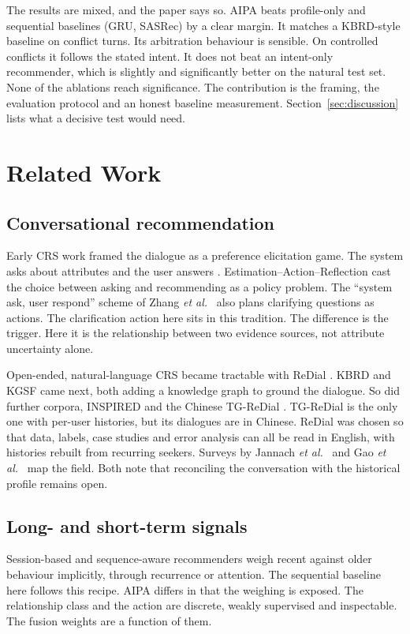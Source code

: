 The results are mixed, and the paper says so. AIPA beats profile-only and sequential baselines (GRU, SASRec) by a clear margin. It matches a KBRD-style baseline on conflict turns. Its arbitration behaviour is sensible. On controlled conflicts it follows the stated intent. It does not beat an intent-only recommender, which is slightly and significantly better on the natural test set. None of the ablations reach significance. The contribution is the framing, the evaluation protocol and an honest baseline measurement. Section~\ref{sec:discussion} lists what a decisive test would need.

\section{Related Work}
\subsection{Conversational recommendation}
Early CRS work framed the dialogue as a preference elicitation game. The system asks about attributes and the user answers \cite{christakopoulou2016towards,sun2018crm}. Estimation--Action--Reflection \cite{lei2020ear} cast the choice between asking and recommending as a policy problem. The ``system ask, user respond'' scheme of Zhang \emph{et al.}\ \cite{zhang2018conversational} also plans clarifying questions as actions. The clarification action here sits in this tradition. The difference is the trigger. Here it is the relationship between two evidence sources, not attribute uncertainty alone.

Open-ended, natural-language CRS became tractable with ReDial \cite{li2018redial}. KBRD \cite{chen2019kbrd} and KGSF \cite{zhou2020kgsf} came next, both adding a knowledge graph to ground the dialogue. So did further corpora, INSPIRED \cite{hayati2020inspired} and the Chinese TG-ReDial \cite{zhou2020tgredial}. TG-ReDial is the only one with per-user histories, but its dialogues are in Chinese. ReDial was chosen so that data, labels, case studies and error analysis can all be read in English, with histories rebuilt from recurring seekers. Surveys by Jannach \emph{et al.}\ \cite{jannach2021survey} and Gao \emph{et al.}\ \cite{gao2021advances} map the field. Both note that reconciling the conversation with the historical profile remains open.

\subsection{Long- and short-term signals}
Session-based and sequence-aware recommenders \cite{hidasi2016gru4rec,kang2018sasrec,quadrana2018sequence} weigh recent against older behaviour implicitly, through recurrence or attention. The sequential baseline here follows this recipe. AIPA differs in that the weighing is exposed. The relationship class and the action are discrete, weakly supervised and inspectable. The fusion weights are a function of them.

